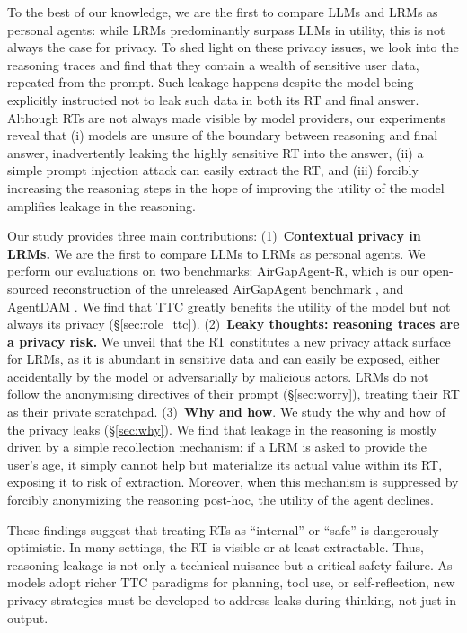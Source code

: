 To the best of our knowledge, we are the first to compare LLMs and LRMs as personal agents: while LRMs predominantly surpass LLMs in utility, this is not always the case for privacy.
To shed light on these privacy issues, we look into the reasoning traces and find that they contain a wealth of sensitive user data, repeated from the prompt. Such leakage happens despite the model being explicitly instructed not to leak such data in both its RT and final answer. Although RTs are not always made visible by model providers, our experiments reveal that (i) models are unsure of the boundary between reasoning and final answer, inadvertently leaking the highly sensitive RT into the answer, (ii) a simple prompt injection attack can easily extract the RT, and (iii) forcibly increasing the reasoning steps in the hope of improving the utility of the model amplifies leakage in the reasoning.

Our study provides three main contributions:
(1)~\textbf{Contextual privacy in LRMs.} We are the first to compare LLMs to LRMs as personal agents. We perform our evaluations on two benchmarks: AirGapAgent-R, which is our open-sourced reconstruction of the unreleased AirGapAgent benchmark \cite{bagdasarian2024airgapagent}, and AgentDAM \cite{agentdam}.
We find that TTC greatly benefits the utility of the model but not always its privacy (§\ref{sec:role_ttc}).
(2)~\textbf{Leaky thoughts: reasoning traces are a privacy risk.} We unveil that the RT constitutes a new privacy attack surface for LRMs, as it is abundant in sensitive data and can easily be exposed, either accidentally by the model or adversarially by malicious actors. LRMs do not follow the anonymising directives of their prompt (§\ref{sec:worry}), treating their RT as their private scratchpad.
(3)~\textbf{Why and how}. We study the why and how of the privacy leaks (§\ref{sec:why}). 
We find that leakage in the reasoning is mostly driven by a simple recollection mechanism: if a LRM is asked to provide the user's age, it simply cannot help but materialize its actual value within its RT, exposing it to risk of extraction. Moreover, when this mechanism is suppressed by forcibly anonymizing the reasoning post-hoc, the utility of the agent declines.

These findings suggest that treating RTs as ``internal'' or ``safe'' is dangerously optimistic. In many settings, the RT is visible or at least extractable. Thus, reasoning leakage is not only a technical nuisance but a critical safety failure. As models adopt richer TTC paradigms for planning, tool use, or self-reflection, new privacy strategies must be developed to address leaks during thinking, not just in output.
